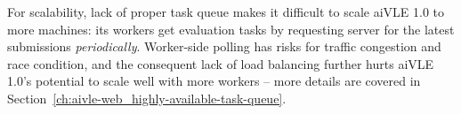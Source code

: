 For scalability, lack of proper task queue makes it difficult to scale aiVLE 1.0 to more machines: its workers get evaluation tasks by requesting server for the latest submissions \textit{periodically}. Worker-side polling has risks for traffic congestion and race condition, and the consequent lack of load balancing further hurts aiVLE 1.0’s potential to scale well with more workers – more details are covered in Section~\ref{ch:aivle-web_highly-available-task-queue}.